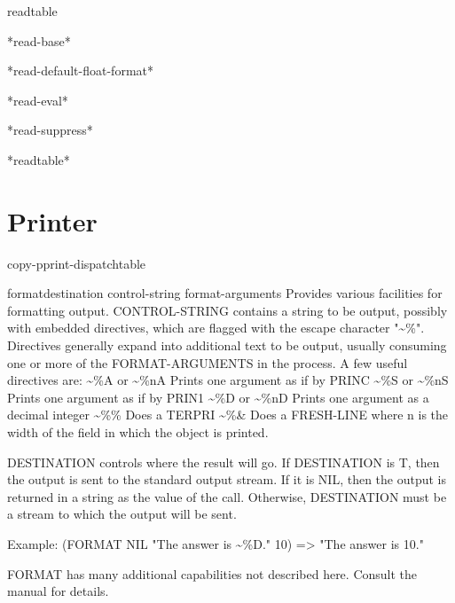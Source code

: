 \begin{class}{readtable}{}
  
\end{class}

\begin{variable}{*read-base*}{}
  
\end{variable}

\begin{variable}{*read-default-float-format*}{}
  
\end{variable}

\begin{variable}{*read-eval*}{}
  
\end{variable}

\begin{variable}{*read-suppress*}{}
  
\end{variable}

\begin{variable}{*readtable*}{}
  
\end{variable}

\section{Printer}

\begin{function}{copy-pprint-dispatch}{\op table}
  
\end{function}

\begin{function}{format}{destination control-string \rest format-arguments}
  Provides various facilities for formatting output.
  CONTROL-STRING contains a string to be output, possibly with embedded
  directives, which are flagged with the escape character "\~{}\%". Directives
  generally expand into additional text to be output, usually consuming one
  or more of the FORMAT-ARGUMENTS in the process. A few useful directives
  are:
        \~{}\%A or \~{}\%nA   Prints one argument as if by PRINC
        \~{}\%S or \~{}\%nS   Prints one argument as if by PRIN1
        \~{}\%D or \~{}\%nD   Prints one argument as a decimal integer
        \~{}\%\%          Does a TERPRI
        \~{}\%\&          Does a FRESH-LINE
  where n is the width of the field in which the object is printed.

  DESTINATION controls where the result will go. If DESTINATION is T, then
  the output is sent to the standard output stream. If it is NIL, then the
  output is returned in a string as the value of the call. Otherwise,
  DESTINATION must be a stream to which the output will be sent.

  Example:   (FORMAT NIL "The answer is \~{}\%D." 10) => "The answer is 10."

  FORMAT has many additional capabilities not described here. Consult the
  manual for details.
\end{function}

